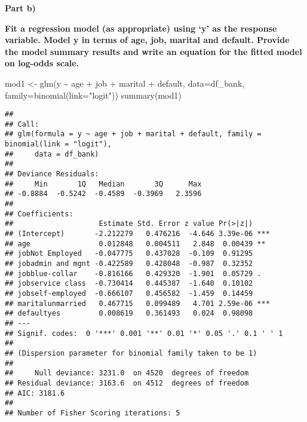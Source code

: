 \documentclass[
]{article}
\newenvironment{Shaded}{\begin{snugshade}}{\end{snugshade}}
\newcommand{\AttributeTok}[1]{\textcolor[rgb]{0.77,0.63,0.00}{#1}}
\newcommand{\DecValTok}[1]{\textcolor[rgb]{0.00,0.00,0.81}{#1}}
\newcommand{\FunctionTok}[1]{\textcolor[rgb]{0.00,0.00,0.00}{#1}}
\newcommand{\NormalTok}[1]{#1}
\newcommand{\OtherTok}[1]{\textcolor[rgb]{0.56,0.35,0.01}{#1}}
\newcommand{\SpecialCharTok}[1]{\textcolor[rgb]{0.00,0.00,0.00}{#1}}
\newcommand{\StringTok}[1]{\textcolor[rgb]{0.31,0.60,0.02}{#1}}
\begin{document}
\textbf{Part b)}

\textbf{Fit a regression model (as appropriate) using `y' as the
response variable. Model y in terms of age, job, marital and default.
Provide the model summary results and write an equation for the fitted
model on log-odds scale.}

\begin{Shaded}
\end{Shaded}

\begin{Shaded}
\begin{Highlighting}[]
\NormalTok{mod1 }\OtherTok{\textless{}{-}} \FunctionTok{glm}\NormalTok{(y }\SpecialCharTok{\textasciitilde{}}\NormalTok{ age }\SpecialCharTok{+}\NormalTok{ job }\SpecialCharTok{+}\NormalTok{ marital }\SpecialCharTok{+}\NormalTok{ default, }\AttributeTok{data=}\NormalTok{df\_bank,}
          \AttributeTok{family=}\FunctionTok{binomial}\NormalTok{(}\AttributeTok{link=}\StringTok{"logit"}\NormalTok{))}
\FunctionTok{summary}\NormalTok{(mod1)}
\end{Highlighting}
\end{Shaded}

\begin{verbatim}
## 
## Call:
## glm(formula = y ~ age + job + marital + default, family = binomial(link = "logit"), 
##     data = df_bank)
## 
## Deviance Residuals: 
##     Min       1Q   Median       3Q      Max  
## -0.8884  -0.5242  -0.4589  -0.3969   2.3596  
## 
## Coefficients:
##                    Estimate Std. Error z value Pr(>|z|)    
## (Intercept)       -2.212279   0.476216  -4.646 3.39e-06 ***
## age                0.012848   0.004511   2.848  0.00439 ** 
## jobNot Employed   -0.047775   0.437028  -0.109  0.91295    
## jobadmin and mgnt -0.422589   0.428048  -0.987  0.32352    
## jobblue-collar    -0.816166   0.429320  -1.901  0.05729 .  
## jobservice class  -0.730414   0.445387  -1.640  0.10102    
## jobself-employed  -0.666107   0.456582  -1.459  0.14459    
## maritalunmarried   0.467715   0.099489   4.701 2.59e-06 ***
## defaultyes         0.008619   0.361493   0.024  0.98098    
## ---
## Signif. codes:  0 '***' 0.001 '**' 0.01 '*' 0.05 '.' 0.1 ' ' 1
## 
## (Dispersion parameter for binomial family taken to be 1)
## 
##     Null deviance: 3231.0  on 4520  degrees of freedom
## Residual deviance: 3163.6  on 4512  degrees of freedom
## AIC: 3181.6
## 
## Number of Fisher Scoring iterations: 5
\end{verbatim}
\end{document}
